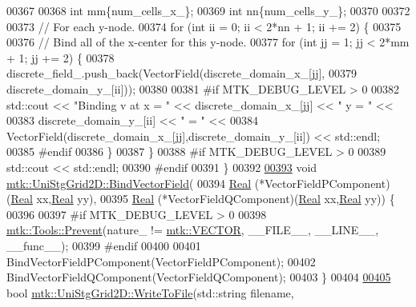 \begin{DoxyCode}
00367 
00368   \textcolor{keywordtype}{int} mm\{num\_cells\_x\_\};
00369   \textcolor{keywordtype}{int} nn\{num\_cells\_y\_\};
00370 
00372 
00373   \textcolor{comment}{// For each y-node.}
00374   \textcolor{keywordflow}{for} (\textcolor{keywordtype}{int} ii = 0; ii < 2*nn + 1; ii += 2) \{
00375 
00376     \textcolor{comment}{// Bind all of the x-center for this y-node.}
00377     \textcolor{keywordflow}{for} (\textcolor{keywordtype}{int} jj = 1; jj < 2*mm + 1; jj += 2) \{
00378       discrete\_field\_.push\_back(VectorField(discrete\_domain\_x\_[jj],
00379                                             discrete\_domain\_y\_[ii]));
00380 
00381 \textcolor{preprocessor}{      #if MTK\_DEBUG\_LEVEL > 0}
00382       std::cout << \textcolor{stringliteral}{"Binding v at x = "} << discrete\_domain\_x\_[jj] << \textcolor{stringliteral}{" y = "} <<
00383         discrete\_domain\_y\_[ii] << \textcolor{stringliteral}{" = "} <<
00384         VectorField(discrete\_domain\_x\_[jj],discrete\_domain\_y\_[ii]) << std::endl;
00385 \textcolor{preprocessor}{      #endif}
00386     \}
00387   \}
00388 \textcolor{preprocessor}{  #if MTK\_DEBUG\_LEVEL > 0}
00389   std::cout << std::endl;
00390 \textcolor{preprocessor}{  #endif}
00391 \}
00392 
\hypertarget{mtk__uni__stg__grid__2d_8cc_source_l00393}{}\hyperlink{classmtk_1_1UniStgGrid2D_a1cba89c285973514c1351760d598c52b}{00393} \textcolor{keywordtype}{void} \hyperlink{classmtk_1_1UniStgGrid2D_a1cba89c285973514c1351760d598c52b}{mtk::UniStgGrid2D::BindVectorField}(
00394   \hyperlink{group__c01-roots_gac080bbbf5cbb5502c9f00405f894857d}{Real} (*VectorFieldPComponent)(\hyperlink{group__c01-roots_gac080bbbf5cbb5502c9f00405f894857d}{Real} xx,\hyperlink{group__c01-roots_gac080bbbf5cbb5502c9f00405f894857d}{Real} yy),
00395   \hyperlink{group__c01-roots_gac080bbbf5cbb5502c9f00405f894857d}{Real} (*VectorFieldQComponent)(\hyperlink{group__c01-roots_gac080bbbf5cbb5502c9f00405f894857d}{Real} xx,\hyperlink{group__c01-roots_gac080bbbf5cbb5502c9f00405f894857d}{Real} yy)) \{
00396 
00397 \textcolor{preprocessor}{  #if MTK\_DEBUG\_LEVEL > 0}
00398   \hyperlink{classmtk_1_1Tools_afe5bb096309258e2e72503fd7b41c7e0}{mtk::Tools::Prevent}(nature\_ != \hyperlink{namespacemtk_ga4c54f2a329cfb4e56213b02a259d19e2a3d8cb27a993651a74d67fb8c98ae91b2}{mtk::VECTOR}, \_\_FILE\_\_, \_\_LINE\_\_, \_\_func\_\_);
00399 \textcolor{preprocessor}{  #endif}
00400 
00401   BindVectorFieldPComponent(VectorFieldPComponent);
00402   BindVectorFieldQComponent(VectorFieldQComponent);
00403 \}
00404 
\hypertarget{mtk__uni__stg__grid__2d_8cc_source_l00405}{}\hyperlink{classmtk_1_1UniStgGrid2D_a3507e3cf41631e5a5801af8ee6e233b0}{00405} \textcolor{keywordtype}{bool} \hyperlink{classmtk_1_1UniStgGrid2D_a3507e3cf41631e5a5801af8ee6e233b0}{mtk::UniStgGrid2D::WriteToFile}(std::string filename,

\end{DoxyCode}

